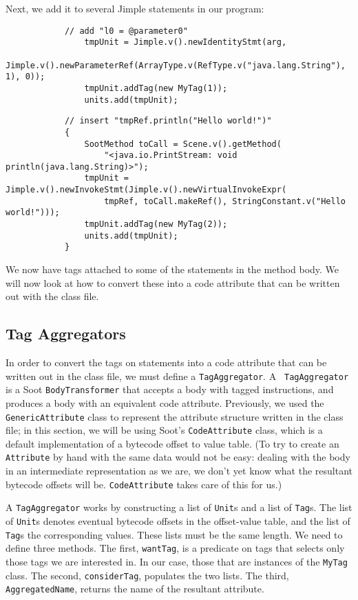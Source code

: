 \documentclass{article}
\begin{document}
Next, we add it to several Jimple statements in our program:

\begin{verbatim}
            // add "l0 = @parameter0"
                tmpUnit = Jimple.v().newIdentityStmt(arg,
                     Jimple.v().newParameterRef(ArrayType.v(RefType.v("java.lang.String"), 1), 0));
                tmpUnit.addTag(new MyTag(1));
                units.add(tmpUnit);
\end{verbatim}

\begin{verbatim}
            // insert "tmpRef.println("Hello world!")"
            {
                SootMethod toCall = Scene.v().getMethod(
                    "<java.io.PrintStream: void println(java.lang.String)>");
                tmpUnit = Jimple.v().newInvokeStmt(Jimple.v().newVirtualInvokeExpr(
                    tmpRef, toCall.makeRef(), StringConstant.v("Hello world!")));
                tmpUnit.addTag(new MyTag(2));
                units.add(tmpUnit);
            }
\end{verbatim}

We now have tags attached to some of the statements in the method body. We 
will now look at how to convert these into a code attribute that can be 
written out with the class file.

\subsection{Tag Aggregators}

In order to convert the tags on statements into a code attribute that can be 
written out in the class file, we must define a {\tt TagAggregator}. A {\tt 
TagAggregator} is a Soot {\tt BodyTransformer} that accepts a body with tagged 
instructions, and produces a body with an equivalent code attribute. 
Previously, we used the {\tt GenericAttribute} class to represent the 
attribute structure written in the class file; in this section, we will be 
using Soot's {\tt CodeAttribute} class, which is a default implementation of a 
bytecode offset to value table. (To try to create an {\tt Attribute} by hand 
with the same data would not be easy: dealing with the body in an intermediate 
representation as we are, we don't yet know what the resultant bytecode 
offsets will be. {\tt CodeAttribute} takes care of this for us.)

A {\tt TagAggregator} works by constructing a list of {\tt Unit}s and a list 
of {\tt Tag}s. The list of {\tt Unit}s denotes eventual bytecode offsets in 
the offset-value table, and the list of {\tt Tag}s the corresponding values. 
These lists must be the same length. We need to define three methods. The 
first, {\tt wantTag}, is a predicate on tags that selects only those tags we 
are interested in. In our case, those that are instances of the {\tt MyTag} 
class. The second, {\tt considerTag}, populates the two lists. The third, {\tt 
AggregatedName}, returns the name of the resultant attribute.
\end{document}
